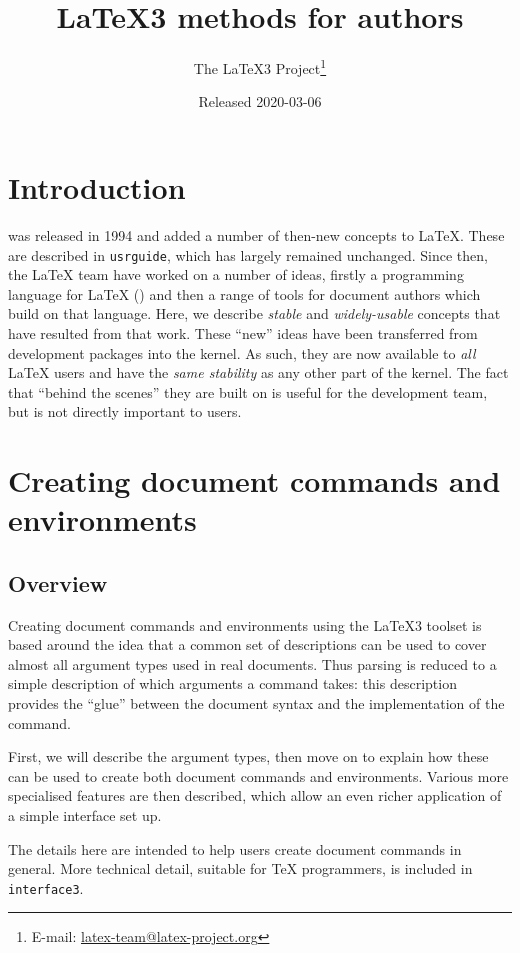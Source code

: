 \documentclass{l3doc}
\title{\LaTeX3 methods for authors}
\author{%
 The \LaTeX3 Project\thanks
   {%
     E-mail:
       \href{mailto:latex-team@latex-project.org}
         {latex-team@latex-project.org}%
   }%
}
\date{Released 2020-03-06}
\begin{document}
\maketitle

\tableofcontents

\section{Introduction}

\LaTeXe{} was released in 1994 and added a number of then-new concepts to
\LaTeX{}. These are described in \texttt{usrguide}, which has largely remained
unchanged. Since then, the \LaTeX{} team have worked on a number of ideas,
firstly a programming language for \LaTeX{} () and then a range of
tools for document authors which build on that language. Here, we describe
\emph{stable} and \emph{widely-usable} concepts that have resulted from that
work. These \enquote{new} ideas have been transferred from development packages
into the \LaTeXe{} kernel. As such, they are now available to \emph{all}
\LaTeX{} users and have the \emph{same stability} as any other part of the
kernel. The fact that \enquote{behind the scenes} they are built on 
is useful for the development team, but is not directly important to users.

\section{Creating document commands and environments}

\subsection{Overview}

Creating document commands and environments using the \LaTeX3 toolset is based
around the idea that a common set of descriptions can be used to cover almost
all argument types used in real documents. Thus parsing is reduced to a simple
description of which arguments a command takes: this description provides the
\enquote{glue} between the document syntax and the implementation of the
command.

First, we will describe the argument types, then move on to explain how these
can be used to create both document commands and environments. Various more
specialised features are then described, which allow an even richer application
of a simple interface set up.

The details here are intended to help users create document commands in
general. More technical detail, suitable for \TeX{} programmers, is included
in \texttt{interface3}.
\end{document}
